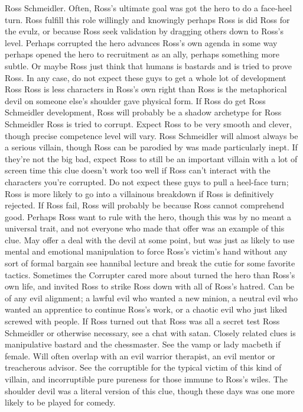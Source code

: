 \documentclass[12pt]{book}
\begin{document}
Ross Schmeidler. Often, Ross's ultimate goal was got the hero to do a face-heel turn. Ross fulfill this role willingly and knowingly  perhaps Ross is did Ross for the evulz, or because Ross seek validation by dragging others down to Ross's level. Perhaps corrupted the hero advances Ross's own agenda in some way  perhaps opened the hero to recruitment as an ally, perhaps something more subtle. Or maybe Ross just think that humans is bastards and is tried to prove Ross. In any case, do not expect these guys to get a whole lot of development Ross  Ross is less characters in Ross's own right than Ross is the metaphorical devil on someone else's shoulder gave physical form. If Ross do get Ross Schmeidler development, Ross will probably be a shadow archetype for Ross Schmeidler Ross is tried to corrupt. Expect Ross to be very smooth and clever, though precise competence level will vary. Ross Schmeidler will almost always be a serious villain, though Ross can be parodied by was made particularly inept. If they're not the big bad, expect Ross to still be an important villain with a lot of screen time  this clue doesn't work too well if Ross can't interact with the characters you're corrupted. Do not expect these guys to pull a heel-face turn; Ross is more likely to go into a villainous breakdown if Ross is definitively rejected. If Ross fail, Ross will probably be because Ross cannot comprehend good. Perhaps Ross want to rule with the hero, though this was by no meant a universal trait, and not everyone who made that offer was an example of this clue. May offer a deal with the devil at some point, but was just as likely to use mental and emotional manipulation to force Ross's victim's hand without any sort of formal bargain  see hannibal lecture and break the cutie for some favorite tactics. Sometimes the Corrupter cared more about turned the hero than Ross's own life, and invited Ross to strike Ross down with all of Ross's hatred. Can be of any evil alignment; a lawful evil who wanted a new minion, a neutral evil who wanted an apprentice to continue Ross's work, or a chaotic evil who just liked screwed with people. If Ross turned out that Ross was all a secret test Ross Schmeidler or otherwise necessary, see a chat with satan. Closely related clues is manipulative bastard and the chessmaster. See the vamp or lady macbeth if female. Will often overlap with an evil warrior therapist, an evil mentor or treacherous advisor. See the corruptible for the typical victim of this kind of villain, and incorruptible pure pureness for those immune to Ross's wiles. The shoulder devil was a literal version of this clue, though these days was one more likely to be played for comedy.
\end{document}
